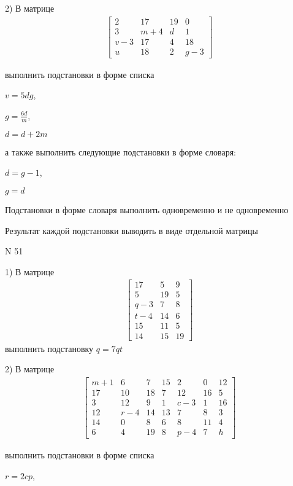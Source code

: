 \documentclass[11pt]{report}
\begin{document}
    2) В матрице
\begin{align*}
\left[\begin{matrix}2 & 17 & 19 & 0\\3 & m + 4 & d & 1\\v - 3 & 17 & 4 & 18\\u & 18 & 2 & g - 3\end{matrix}\right]
\end{align*}

выполнить подстановки в форме списка

$v=5 d g$,

$g=\frac{6 d}{m}$,

$d=d + 2 m$

а также выполнить следующие подстановки в форме словаря:

$d=g - 1$,

$g=d$


    Подстановки в форме словаря выполнить одновременно и не одновременно


    Результат каждой подстановки выводить в виде отдельной матрицы

\newpage
N 51


    1) В матрице
\begin{align*}
\left[\begin{matrix}17 & 5 & 9\\5 & 19 & 5\\q - 3 & 7 & 8\\t - 4 & 14 & 6\\15 & 11 & 5\\14 & 15 & 19\end{matrix}\right]
\end{align*}
выполнить подстановку $q=7 q t$


    2) В матрице
\begin{align*}
\left[\begin{matrix}m + 1 & 6 & 7 & 15 & 2 & 0 & 12\\17 & 10 & 18 & 7 & 12 & 16 & 5\\3 & 12 & 9 & 1 & c - 3 & 1 & 16\\12 & r - 4 & 14 & 13 & 7 & 8 & 3\\14 & 0 & 8 & 6 & 8 & 11 & 4\\6 & 4 & 19 & 8 & p - 4 & 7 & h\end{matrix}\right]
\end{align*}

выполнить подстановки в форме списка

$r=2 c p$,
\end{document}
